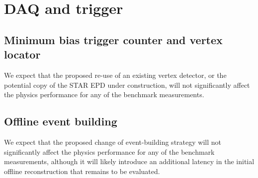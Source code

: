 \section{DAQ and trigger}
\subsection{Minimum bias trigger counter and vertex locator}
We expect that the proposed re-use of an existing vertex detector, or the potential copy of the STAR EPD under construction, will not significantly affect
the physics performance for any of the benchmark measurements.
\subsection{Offline event building}
We expect that the proposed change of event-building strategy will not significantly affect the physics performance for any of the benchmark measurements,
although it will likely introduce an additional latency in the initial offline reconstruction that remains to be evaluated.

